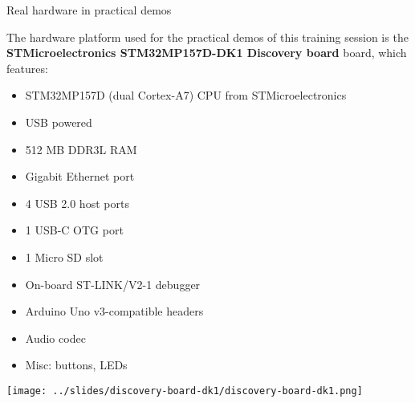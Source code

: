 \documentclass[a4paper,12pt,obeyspaces,spaces,hyphens]{article}
\begin{document}
\feshowtitle

\onlinepedagogics
{}
\certificate{}
\disabilities{}

\feagendatwocolumn
{Real hardware in practical demos}
{
  The hardware platform used for the practical demos of this training
  session is the {\bf STMicroelectronics STM32MP157D-DK1 Discovery
    board} board, which features:

  \begin{itemize}
  \item STM32MP157D (dual Cortex-A7) CPU from STMicroelectronics
  \item USB powered
  \item 512 MB DDR3L RAM
  \item Gigabit Ethernet port
  \item 4 USB 2.0 host ports
  \item 1 USB-C OTG port
  \item 1 Micro SD slot
  \item On-board ST-LINK/V2-1 debugger
  \item Arduino Uno v3-compatible headers
  \item Audio codec
  \item Misc: buttons, LEDs
  \end{itemize}
}
{}
{
  \begin{center}
  \texttt{[image: ../slides/discovery-board-dk1/discovery-board-dk1.png]}
  \end{center}
}
\end{document}
